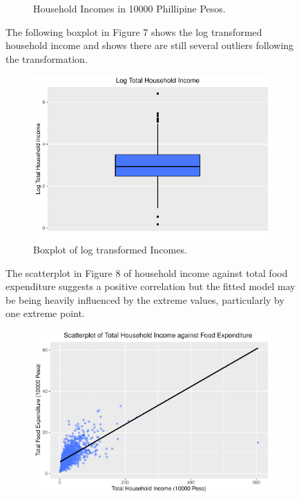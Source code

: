 \documentclass[
]{article}
\begin{document}
\begin{figure}[H]
\begin{figure}[H]
{}

\caption{Household Incomes in 10000 Phillipine Pesos.}\label{fig:balance boxplot}
\end{figure}

The following boxplot in Figure 7 shows the log transformed household
income and shows there are still several outliers following the
transformation.

\begin{figure}[H]

{\centering \includegraphics[width=0.8\linewidth]{Group_01_Project2_demo_files/figure-latex/balance boxplot2-1} 

}

\caption{Boxplot of log transformed Incomes.}\label{fig:balance boxplot2}
\end{figure}

The scatterplot in Figure 8 of household income against total food
expenditure suggests a positive correlation but the fitted model may be
being heavily influenced by the extreme values, particularly by one
extreme point.

\begin{figure}[H]

{\centering \includegraphics[width=0.8\linewidth]{Group_01_Project2_demo_files/figure-latex/balance_plot-1} 

}
\end{figure}
\end{figure}
\end{document}
